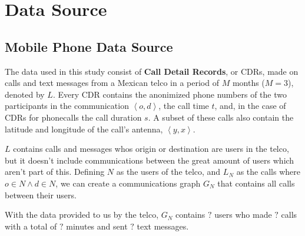 \section{Data Source}

\subsection{Mobile Phone Data Source}

The data used in this study consist of \textbf{Call Detail Records}, or CDRs, made on calls and text messages from a Mexican telco in a period of \( M \) months (\( M = 3 \)), denoted by \( L \). Every CDR contains the anonimized phone numbers of the two participants in the communication \(\left<o, d\right>\), the call time \( t \), and, in the case of CDRs for phonecalls the call duration \( s \). A subset of these calls also contain the latitude and longitude of the call's antenna, \( \left<y, x\right> \).

\( L \) contains calls and messages whos origin or destination are users in the telco, but it doesn't include communications between the great amount of users which aren't part of this. Defining \( N \) as the users of the telco, and \( L_N \) as the calls where \( o \in N \wedge d \in N \), we can create a communications graph \( G_N \) that contains all calls between their users.

With the data provided to us by the telco, \( G_N \) contains \( ? \) users who made \( ? \) calls with a total of \( ? \) minutes and sent \( ? \) text messages.